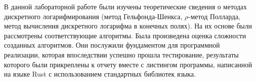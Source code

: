 \documentclass[bachelor, och, labwork]{shiza}
\begin{document}


\conclusion

    В данной лабораторной работе были изучены теоретические сведения о методах
    дискретного логарифмирования (метод Гельфонда-Шенкса, $\rho$-метод Полларда,
    метод вычисления дискретного логарифма в конечных полях). На их основе были
    рассмотрены соответствующие алгоритмы. Была произведена оценка сложности
    созданных алгоритмов. Они послужили фундаментом для программной реализации,
    которая впоследствии успешно прошла тестирование, результаты которого были
    прикреплены к отчету вместе с листингом программы, написанной на языке Rust
    с использованием стандартных библиотек языка.
\end{document}
